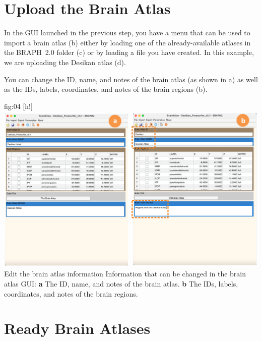 \documentclass[justified]{tufte-handout}
\begin{document}
\clearpage
\section{Upload the Brain Atlas}

In the GUI launched in the previous step, you have a menu that can be used to import a brain atlas (b) either by loading one of the already-available atlases in the BRAPH~2.0 folder  (c) or by loading a file you have created. In this example, we are uploading the Desikan atlas (d).

You can change the ID, name, and notes of the brain atlas (as shown in a) as well as the IDs, labels, coordinates, and notes of the brain regions (b).
	
	{fig:04}
	{
	[h!]
	\includegraphics{fig04.png}
	}
	{Edit the brain atlas information}
	{
	Information that can be changed in the brain atlas GUI: 
	{\bf a} The ID, name, and notes of the brain atlas.
	{\bf b} The IDs, labels, coordinates, and notes of the brain regions.
	}

\section{Ready Brain Atlases}
\end{document}
